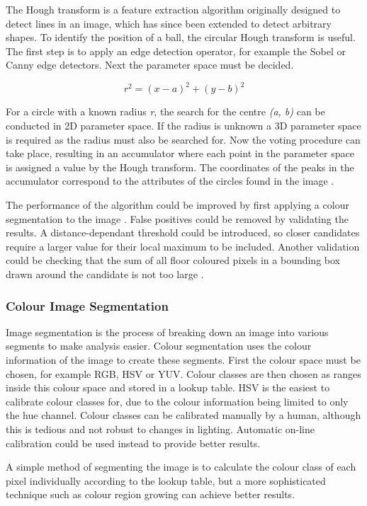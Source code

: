The Hough transform is a feature extraction algorithm originally designed to detect lines in an image, which has since been extended to detect arbitrary shapes. To identify the position of a ball, the circular Hough transform is useful. The first step is to apply an edge detection operator, for example the Sobel or Canny edge detectors. Next the parameter space must be decided. 

\[ r^2 = (x-a)^2 + (y-b)^2 \]

For a circle with a known radius \textit{r}, the search for the centre \textit{(a, b)} can be conducted in 2D parameter space. If the radius is unknown a 3D parameter space is required as the radius must also be searched for. Now the voting procedure can take place, resulting in an accumulator where each point in the parameter space is assigned a value by the Hough transform. The coordinates of the peaks in the accumulator correspond to the attributes of the circles found in the image \cite{ribeiro2009}.

The performance of the algorithm could be improved by first applying a colour segmentation to the image \cite{jonker}. False positives could be removed by validating the results. A distance-dependant threshold could be introduced, so closer candidates require a larger value for their local maximum to be included. Another validation could be checking that the sum of all floor coloured pixels in a bounding box drawn around the candidate is not too large \cite{cambada}.

\subsubsection{Colour Image Segmentation}

Image segmentation is the process of breaking down an image into various segments to make analysis easier. Colour segmentation uses the colour information of the image to create these segments. First the colour space must be chosen, for example RGB, HSV or YUV. Colour classes are then chosen as ranges inside this colour space and stored in a lookup table. HSV is the easiest to calibrate colour classes for, due to the colour information being limited to only the hue channel. Colour classes can be calibrated manually by a human, although this is tedious and not robust to changes in lighting. Automatic on-line calibration \cite{Guerrero2008} could be used instead to provide better results.

A simple method of segmenting the image is to calculate the colour class of each pixel individually according to the lookup table, but a more sophisticated technique such as colour region growing \cite{Gunnarsson2006} can achieve better results.

